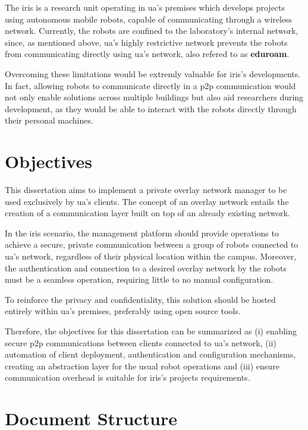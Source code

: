 \documentclass[11pt,twoside,a4paper]{report}
\begin{document}
The \ac{iris} is a research unit operating in \ac{ua}'s premises which develops projects using autonomous mobile robots, capable of communicating through a wireless network. Currently, the robots are confined to the laboratory's internal network, since, as mentioned above, \ac{ua}'s highly restrictive network prevents the robots from communicating directly using \ac{ua}'s network, also refered to as \textbf{eduroam}.

Overcoming these limitations would be extremly valuable for \ac{iris}'s developments. In fact, allowing robots to communicate directly in a \ac{p2p} communication would not only enable solutions across multiple buildings but also aid researchers during development, as they would be able to interact with the robots directly through their personal machines.

\section{Objectives}

This dissertation aims to implement a private overlay network manager to be used exclusively by \ac{ua}'s clients. The concept of an overlay network entails the creation of a communication layer built on top of an already existing network.

In the \ac{iris} scenario, the management platform should provide operations to achieve a secure, private communication between a group of robots connected to \ac{ua}'s network, regardless of their physical location within the campus. Moreover, the authentication and connection to a desired overlay network by the robots must be a seamless operation, requiring little to no manual configuration.

To reinforce the privacy and confidentiality, this solution should be hosted entirely within \ac{ua}'s premises, preferably using open source tools.

Therefore, the objectives for this dissertation can be summarized as (i) enabling secure \ac{p2p} communications between clients connected to \ac{ua}'s network, (ii) automation of client deployment, authentication and configuration mechanisms, creating an abstraction layer for the usual robot operations and (iii) ensure communication overhead is suitable for \ac{iris}'s projects requirements.

\section{Document Structure}
\end{document}
